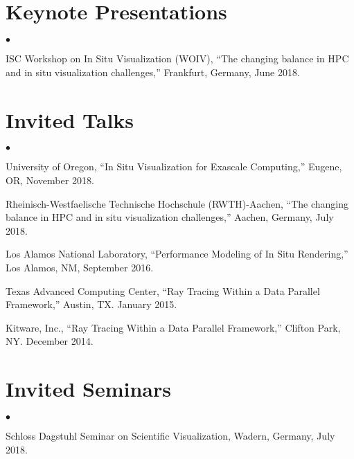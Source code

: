 \documentclass[margin,line]{res}
\newenvironment{list2}{
  \begin{list}{$\bullet$}{%
      \setlength{\itemsep}{0in}
      \setlength{\parsep}{0in} \setlength{\parskip}{0in}
      \setlength{\topsep}{0in} \setlength{\partopsep}{0in}
      \setlength{\leftmargin}{0.2in}}}{\end{list}}
\begin{document}
\begin{resume}
\section{\sc Keynote Presentations}
\begin{list2}
	\item ISC Workshop on In Situ Visualization (WOIV), ``The changing balance in HPC and in situ visualization challenges,''  Frankfurt, Germany, June 2018.
\end{list2}
\section{\sc Invited Talks}
\begin{list2}
	\item University of Oregon, ``In Situ Visualization for Exascale Computing,'' Eugene, OR, November 2018.
	\item Rheinisch-Westfaelische Technische Hochschule (RWTH)-Aachen, ``The changing balance in HPC and in situ visualization challenges,'' Aachen, Germany, July 2018.
	\item Los Alamos National Laboratory, “Performance Modeling of In Situ Rendering,” Los Alamos, NM, September 2016.
	\item Texas Advanced Computing Center, ``Ray Tracing Within a Data Parallel Framework,'' Austin, TX. January 2015.
	\item  Kitware, Inc., ``Ray Tracing Within a Data Parallel Framework,'' Clifton Park, NY. December 2014.
\end{list2}
\section{\sc Invited Seminars}
\begin{list2}
	\item Schloss Dagstuhl Seminar on Scientific Visualization,  Wadern,
	Germany, July 2018.
\end{list2}


\end{resume}
\end{document}

